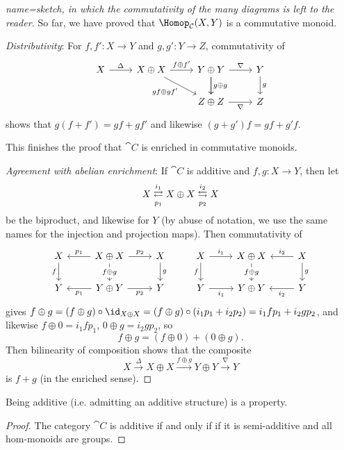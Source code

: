 \documentclass[../main.tex]{subfiles}
\begin{document}
\begin{proof}[name={sketch, in which the commutativity of the many diagrams is left to the reader}]
So far, we have proved that $\Hom_{\cat C}(X,Y)$ is a commutative monoid.

\emph{Distributivity}: For $f,f'\colon X \to Y$ and $g,g'\colon Y  \to Z$, commutativity of 
\[\begin{tikzcd}
  X & {X\oplus X} & {Y\oplus Y} \ar[d, "g\oplus g"] & Y \\
  && {Z\oplus Z} & Z
  \arrow["{gf\oplus gf'}"', from=1-2, to=2-3]
  \arrow[from=1-3, to=2-3]
  \arrow["\nabla", from=1-3, to=1-4]
  \arrow["g", from=1-4, to=2-4]
  \arrow["\nabla"', from=2-3, to=2-4]
  \arrow["{f\oplus f'}", from=1-2, to=1-3]
  \arrow["\Delta", from=1-1, to=1-2]
\end{tikzcd}\]
shows that $g(f+ f') = gf + gf'$ and likewise $(g + g')f = gf + g'f$.

This finishes the proof that \(\cat C\) is enriched in commutative monoids.

\emph{Agreement with abelian enrichment}: If $\cat C$ is additive and $f,g\colon X \to Y$, then let
  \[
      X \xrightleftarrows{i_1}[p_1] X \oplus X \xleftrightarrows{i_2}[p_2] X
    \] be the biproduct, and likewise for $Y$ (by abuse of notation, we use the same names for the injection and projection maps). Then commutativity of
\[\begin{tikzcd}
  X & {X\oplus X} & X & X & {X\oplus X} & X \\
  Y & {Y\oplus Y} & Y & Y & {Y\oplus Y} & Y
  \arrow["f"', from=1-1, to=2-1]
  \arrow["{p_1}"', to=1-1, from=1-2]
  \arrow["{p_2}", from=1-2, to=1-3]
  \arrow["g", from=1-3, to=2-3]
  \arrow["{p_2}"', from=2-2, to=2-3]
  \arrow["p_1", from=2-2, to=2-1]
  \arrow["{f\oplus g}"{description}, from=1-2, to=2-2]
  \arrow["f"', from=1-4, to=2-4]
  \arrow["{i_1}"', from=2-4, to=2-5]
  \arrow["{i_1}", from=1-4, to=1-5]
  \arrow["{i_2}"', from=1-6, to=1-5]
  \arrow["{i_2}", from=2-6, to=2-5]
  \arrow["g", from=1-6, to=2-6]
  \arrow["{f\oplus g}" description, from=1-5, to=2-5]
\end{tikzcd}\]
gives $f \oplus g = (f \oplus g) \circ \id_{X \oplus X} = (f \oplus g) \circ (i_1 p_1 + i_2 p_2) = i_1 f p_1 + i_2 g p_2$, and likewise $f \oplus 0 = i_1 f p_1$, $0 \oplus g = i_2 g p_2$, so \[
      f \oplus g = (f \oplus 0) + (0 \oplus g).
    \] Then bilinearity of composition shows that the composite
  \[
      X \xrightarrow{\Delta} X \oplus X \xrightarrow{f \oplus g} Y \oplus Y \xrightarrow{\nabla} Y
    \] is $f + g$ (in the enriched sense).
\end{proof}
\begin{cor}
  Being additive (i.e. admitting an additive structure) is a property.
\end{cor}
\begin{proof}
  The category $\cat C$ is additive if and only if if it is semi-additive and all hom-monoids are groups.
\end{proof}
\end{document}
